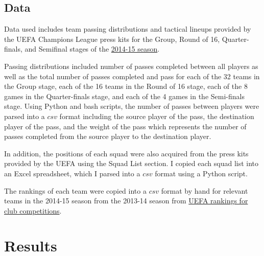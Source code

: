 \documentclass[11pt,letterpaper]{article}
\begin{document}
\subsection{Data}
Data used includes team passing distributions and tactical lineups provided by the UEFA Champions League press kits for the Group, Round of 16, Quarter-finals, and Semifinal stages of the \href{http://www.uefa.org/mediaservices/presskits/uefachampionsleague/season=2015/index.html}{2014-15 season}. 

Passing distributions included number of passes completed between all players as well as the total number of passes completed and pass for each of the 32 teams in the Group stage, each of the 16 teams in the Round of 16 stage, each of the 8 games in the Quarter-finals stage, and each of the 4 games in the Semi-finals stage. Using Python and bash scripts, the number of passes between players were parsed into a $csv$ format including the source player of the pass, the destination player of the pass, and the weight of the pass which represents the number of passes completed from the source player to the destination player.

In addition, the positions of each squad were also acquired from the press kits provided by the UEFA using the Squad List section. I copied each squad list into an Excel spreadsheet, which I parsed into a $csv$ format using a Python script.

The rankings of each team were copied into a $csv$ format by hand for relevant teams in the 2014-15 season from the 2013-14 season from \href{http://www.uefa.com/memberassociations/uefarankings/club/season=2015/index.html}{UEFA rankings for club competitions}.
\section{Results}


\end{document}
